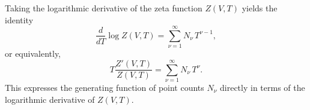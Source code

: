Taking the logarithmic derivative of the zeta function $Z(V,T)$ yields the identity
$$\frac{d}{dT} \log Z(V,T) = \sum_{\nu=1}^{\infty} N_\nu \, T^{\nu-1},$$
or equivalently,
$$T \frac{Z'(V,T)}{Z(V,T)} = \sum_{\nu=1}^{\infty} N_\nu \, T^{\nu}.$$
This expresses the generating function of point counts $N_\nu$ directly in terms of the logarithmic derivative of $Z(V,T)$.
